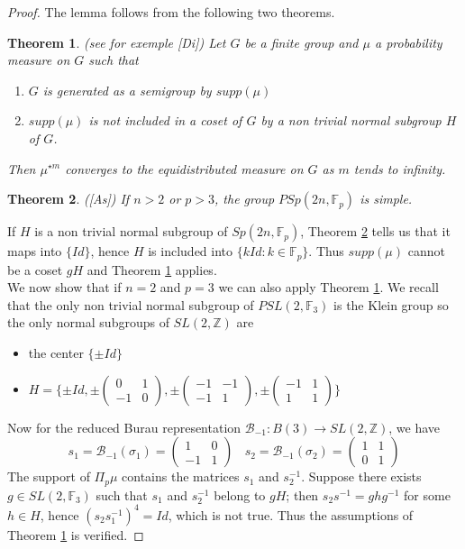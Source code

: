 \documentclass[10pt,a4paper]{amsart}
\newtheorem{thm}{Theorem}
\begin{document}
\begin{proof}
The lemma follows from the following two theorems. 
\begin{thm}\label{groupe fini}
	(see for exemple [Di])
	Let  $G$ be a finite group and $\mu$ a probability measure on $G$ such that 
	\begin{enumerate}
		\item 
$G$ is generated as a semigroup by 	$supp(\mu)$
\item $supp(\mu)$ is not included in a coset of $G$ by a non trivial normal subgroup $H$ of $G$.
\end{enumerate}
  Then $\mu^{\star m}$ converges to the equidistributed measure on $G$ as $m$ tends to infinity.
\end{thm}
\begin{thm}\label{psl simple} ([As]) If $n> 2$ or $p> 3$, the group $PSp(2n,{\mathbb{F}_p})$ is simple.
	\end{thm} 
If $H$ is a non trivial normal subgroup of $Sp(2n,\mathbb{F}_p)$, 
Theorem \ref{psl simple} tells us that it maps into $\{Id\}$, hence $H$ is included into $\{kId: k\in \mathbb{F}_p\}$. Thus $supp(\mu)$ cannot be a  coset $gH$ and Theorem \ref{groupe fini} applies.\\
We now show that if $n=2$ and $p=3$ we can also apply Theorem \ref{groupe fini}. We recall that the only non trivial normal subgroup of $PSL(2,\mathbb{F}_3)$ is the Klein group  so the only normal subgroups of $SL(2,\mathbb{Z})$ are 
\begin{itemize}
	\item the center $\{\pm Id\}$
	\item 
	$H=\{\pm Id, \pm\begin{pmatrix}
	0 & 1 \\
	-1 & 0 
	\end{pmatrix}, \pm\begin{pmatrix}
	-1 & -1 \\
	-1 & 1 
	\end{pmatrix}, \pm\begin{pmatrix}
	-1 & 1 \\
	1 & 1 
	\end{pmatrix}\}$
	\end{itemize}
Now for the reduced Burau representation ${\mathcal B}_{-1}:B(3)\longrightarrow SL(2,\mathbb{Z})$, we have
\begin{equation}\label{les generateurs}
s_1={\mathcal B}_{-1}(\sigma_1)=\begin{pmatrix}
1 & 0 \\
-1 & 1 
\end{pmatrix}\ \ \ \ s_2={\mathcal B}_{-1}(\sigma_2)=\begin{pmatrix}
1 & 1 \\
0 & 1 
\end{pmatrix}
\end{equation}
The support of $\Pi_p\mu$ contains the matrices $s_1$ and $s_2^{-1}$. Suppose there exists $g\in SL(2,\mathbb{F}_3)$ such that $s_1$ and $s_2^{-1}$ belong to $gH$; then $s_2s^{-1}=ghg^{-1}$ for some $h\in H$, hence $(s_2s_1^{-1})^4=Id$, which is not true. Thus the assumptions of Theorem \ref{groupe fini} is verified.
\end{proof}
\end{document}
